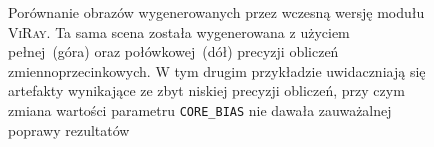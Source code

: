 \begin{enumerate}
\begin{figure}[H]
\centering
{}
\caption[Porównanie obrazów wygenerowanych przez wczesną wersję modułu \textsc{ViRay} za pomocą liczb o różnej precyzji]{Porównanie obrazów wygenerowanych przez wczesną wersję modułu \textsc{ViRay}. Ta sama scena została wygenerowana z użyciem pełnej~(góra) oraz połówkowej~(dół) precyzji obliczeń zmiennoprzecinkowych. W tym drugim przykładzie uwidaczniają się artefakty wynikające ze zbyt niskiej precyzji obliczeń, przy czym zmiana wartości parametru \texttt{CORE\_BIAS} nie dawała zauważalnej poprawy rezultatów}
\label{ch3:img:float_vs_half}
\end{figure}
\end{enumerate}

